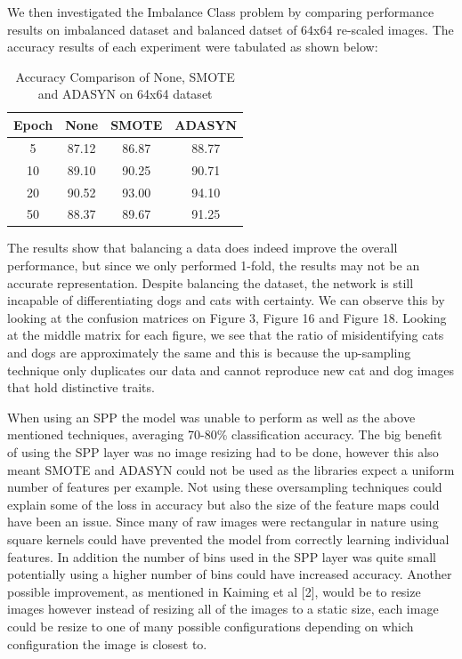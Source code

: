 \documentclass{article}
\begin{document}
We then investigated the Imbalance Class problem by comparing performance results on imbalanced dataset and balanced datset of 64x64 re-scaled images. The accuracy results of each experiment were tabulated as shown below:
\begin{table}[ht]
	\caption{Accuracy Comparison of None, SMOTE and ADASYN on 64x64 dataset} %
	\centering %
	\begin{tabular}{c c c c} %
		\hline\hline %
		
		Epoch &  None & SMOTE & ADASYN\\
		\hline

		\hline %
		5  &  87.12 & 86.87 & 88.77\\
		10 &  89.10 & 90.25 & 90.71\\
		20 &  90.52 & 93.00 & 94.10\\
		50 &  88.37 & 89.67 & 91.25\\ [1ex] %
		\hline %
	\end{tabular}
	\label{table:balanced} %
\end{table} 

The results show that balancing a data does indeed improve the overall performance, but since we only performed 1-fold, the results may not be an accurate representation. Despite balancing the dataset, the network is still incapable of differentiating dogs and cats with certainty. We can observe this by looking at the confusion matrices on Figure 3, Figure 16 and Figure 18. Looking at the middle matrix for each figure, we see that the ratio of misidentifying cats and dogs are approximately the same and this is because the up-sampling technique only duplicates our data and cannot reproduce new cat and dog images that hold distinctive traits. 

When using an SPP the model was unable to perform as well as the above mentioned techniques, averaging 70-80\% classification accuracy. The big benefit of using the SPP layer was no image resizing had to be done, however this also meant SMOTE and ADASYN could not be used as the libraries expect a uniform number of features per example. Not using these oversampling techniques could explain some of the loss in accuracy but also the size of the feature maps could have been an issue. Since many of raw images were rectangular in nature using square kernels could have prevented the model from correctly learning individual features. In addition the number of bins used in the SPP layer was quite small potentially using a higher number of bins could have increased accuracy. Another possible improvement, as mentioned in Kaiming et al [2], would be to resize images however instead of resizing all of the images to a static size, each image could be resize to one of many possible configurations depending on which configuration the image is closest to.
\end{document}
